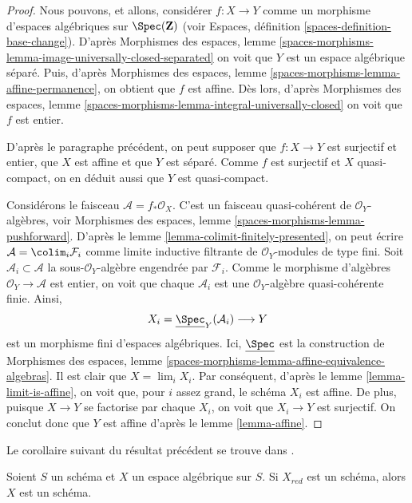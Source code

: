 \begin{proof}
Nous pouvons, et allons, considérer $f : X \to Y$ comme un morphisme d'espaces algébriques sur
$\Spec(\mathbf{Z})$ (voir
Espaces, définition \ref{spaces-definition-base-change}).
D'après Morphismes des espaces, lemme
\ref{spaces-morphisms-lemma-image-universally-closed-separated}
on voit que $Y$ est un espace algébrique séparé. Puis, d'après
Morphismes des espaces, lemme \ref{spaces-morphisms-lemma-affine-permanence},
on obtient que $f$ est affine. Dès lors, d'après
Morphismes des espaces, lemme
\ref{spaces-morphisms-lemma-integral-universally-closed}
on voit que $f$ est entier.

\medskip\noindent
D'après le paragraphe précédent, on peut supposer que $f : X \to Y$
est surjectif et entier, que $X$ est affine et que $Y$ est séparé.
Comme $f$ est surjectif et $X$ quasi-compact, on en déduit aussi que $Y$ est
quasi-compact.

\medskip\noindent
Considérons le faisceau $\mathcal{A} = f_*\mathcal{O}_X$.
C'est un faisceau quasi-cohérent de $\mathcal{O}_Y$-algèbres, voir
Morphismes des espaces, lemme \ref{spaces-morphisms-lemma-pushforward}.
D'après le lemme \ref{lemma-colimit-finitely-presented},
on peut écrire $\mathcal{A} = \colim_i \mathcal{F}_i$ comme limite inductive
filtrante de $\mathcal{O}_Y$-modules de type fini. Soit
$\mathcal{A}_i \subset \mathcal{A}$ la sous-$\mathcal{O}_Y$-algèbre
engendrée par $\mathcal{F}_i$. Comme le morphisme d'algèbres
$\mathcal{O}_Y \to \mathcal{A}$ est entier, on voit que chaque $\mathcal{A}_i$
est une $\mathcal{O}_Y$-algèbre quasi-cohérente finie. Ainsi,
$$
X_i = \underline{\Spec}_Y(\mathcal{A}_i) \longrightarrow Y
$$
est un morphisme fini d'espaces algébriques. Ici,
$\underline{\Spec}$ est la construction de Morphismes des espaces, lemme
\ref{spaces-morphisms-lemma-affine-equivalence-algebras}.
Il est clair
que $X = \lim_i X_i$. Par conséquent, d'après le
lemme \ref{lemma-limit-is-affine},
on voit que, pour $i$ assez grand, le schéma $X_i$ est affine.
De plus, puisque $X \to Y$ se factorise par chaque $X_i$, on voit que
$X_i \to Y$ est surjectif. On conclut donc que $Y$ est affine d'après le
lemme \ref{lemma-affine}.
\end{proof}

\noindent
Le corollaire suivant du résultat précédent se trouve dans
\cite{CLO}.

\begin{lemma}
\label{lemma-reduction-scheme}
\begin{reference}
\cite[3.1.12]{CLO}
\end{reference}
Soient $S$ un schéma et $X$ un espace algébrique sur $S$.
Si $X_{red}$ est un schéma, alors $X$ est un schéma.
\end{lemma}

